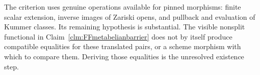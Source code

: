 The criterion uses genuine operations
available for pinned morphisms:
finite scalar extension, inverse images
of Zariski opens, and pullback and
evaluation of Kummer classes. Its
remaining hypothesis is substantial.
The visible nonsplit functional in
Claim~\ref{clm:FFmetabelianbarrier}
does not by itself produce compatible
equalities for these translated pairs,
or a scheme morphism with which to
compare them. Deriving those equalities
is the unresolved existence step.
